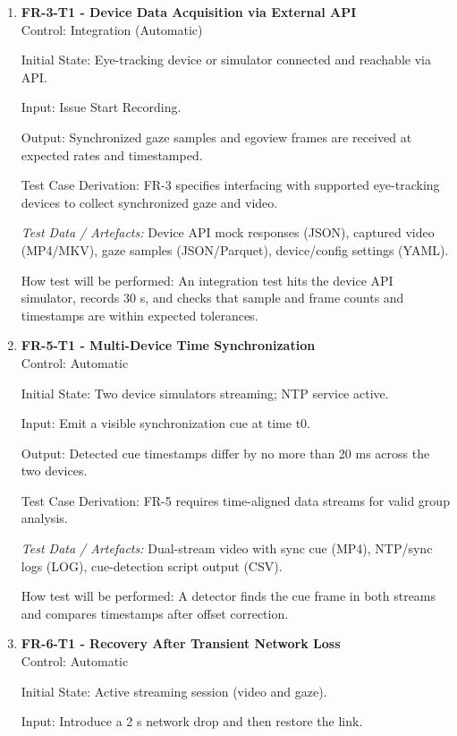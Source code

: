 \documentclass[12pt, titlepage]{article}
\begin{document}
\begin{enumerate}
\item \textbf{FR-3-T1 - Device Data Acquisition via External API} \\

Control: Integration (Automatic)

Initial State: Eye-tracking device or simulator connected and reachable via API.

Input: Issue Start Recording.

Output: Synchronized gaze samples and egoview frames are received at expected rates and timestamped.

Test Case Derivation: FR-3 specifies interfacing with supported eye-tracking devices to collect synchronized gaze and video.

\textit{Test Data / Artefacts:} Device API mock responses (JSON), captured video (MP4/MKV), gaze samples (JSON/Parquet), device/config settings (YAML).

How test will be performed: An integration test hits the device API simulator, records 30 s, and checks that sample and frame counts and timestamps are within expected tolerances.

\item \textbf{FR-5-T1 - Multi-Device Time Synchronization} \\

Control: Automatic

Initial State: Two device simulators streaming; NTP service active.

Input: Emit a visible synchronization cue at time t0.

Output: Detected cue timestamps differ by no more than 20 ms across the two devices.

Test Case Derivation: FR-5 requires time-aligned data streams for valid group analysis.

\textit{Test Data / Artefacts:} Dual-stream video with sync cue (MP4), NTP/sync logs (LOG), cue-detection script output (CSV).

How test will be performed: A detector finds the cue frame in both streams and compares timestamps after offset correction.

\item \textbf{FR-6-T1 - Recovery After Transient Network Loss} \\

Control: Automatic

Initial State: Active streaming session (video and gaze).

Input: Introduce a 2 s network drop and then restore the link.


\end{enumerate}
\end{document}
